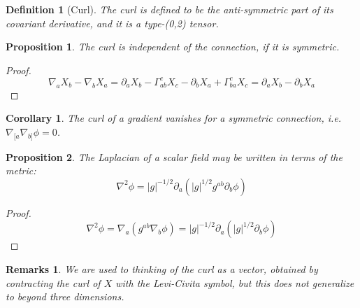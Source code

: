 \documentclass[a4paper]{article}
\newtheorem{remarks}{Remarks}[section]
\theoremstyle{new}
\newtheorem{defi}{Definition}[section]
\newtheorem{prop}{Proposition}[section]
\newtheorem{cor}{Corollary}[section]
\begin{document}
\begin{defi}[Curl]
The curl is defined to be the anti-symmetric part of its covariant derivative, and it is a type-(0,2) tensor.
\end{defi}
\begin{prop}
The curl is independent of the connection, if it is symmetric.
\end{prop}
\begin{proof}
$$\nabla_aX_b-\nabla_bX_a=\partial_aX_b-\Gamma_{ab}^cX_c-\partial_bX_a+\Gamma_{ba}^cX_c=\partial_aX_b-\partial_bX_a$$
\end{proof}
\begin{cor}
The curl of a gradient vanishes for a symmetric connection, i.e. $\nabla_{[a}\nabla_{b]}\phi=0$.
\end{cor}
\begin{prop}
The Laplacian of a scalar field may be written in terms of the metric:
\begin{equation}
\nabla^2\phi=|g|^{-1/2}\partial_a(|g|^{1/2}g^{ab}\partial_b\phi)\label{laplacian}
\end{equation}
\end{prop}
\begin{proof}
$$\nabla^2\phi=\nabla_a(g^{ab}\nabla_b\phi)=|g|^{-1/2}\partial_a(|g|^{1/2}\partial_b\phi)$$
\end{proof}
\begin{remarks}
We are used to thinking of the curl as a vector, obtained by contracting the curl of $X$ with the Levi-Civita symbol, but this does not generalize to beyond three dimensions.
\end{remarks}
\end{document}
